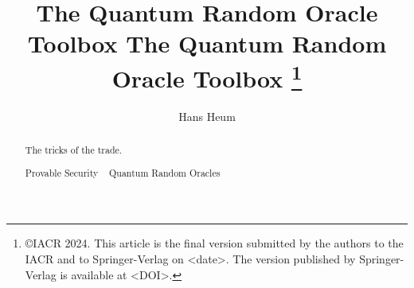 \title{
  \iffullversion
    The Quantum Random Oracle Toolbox
  \else
    The Quantum Random Oracle Toolbox
    \ifauthversion
    \thanks{
      \copyright IACR 2024. This article is the final version submitted by the authors
      to the IACR and to Springer-Verlag on <date>. The version published
      by Springer-Verlag is available at <DOI>.
    }
    \fi
  \fi
}


\ifsubmission
  \author{
    \vspace*{-5mm}
  }
  \institute{
    \vspace*{-5mm}
  }
\else
   \author{
    Hans Heum  %
  }

\fi

\maketitle

\begin{abstract}
  The tricks of the trade.

  \begin{keywords}
    Provable Security \textperiodcentered~
    Quantum Random Oracles
  \end{keywords}
\end{abstract}

\ifeprintfull
  \newpage
  \tableofcontents
  \newpage
\fi
